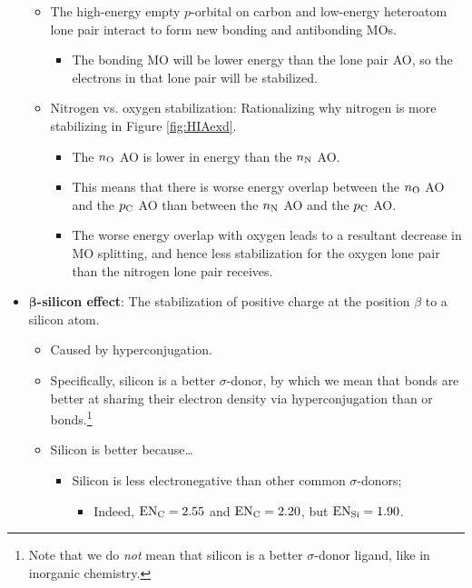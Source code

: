 \documentclass[../notes.tex]{subfiles}
\begin{document}
\begin{itemize}
    \begin{itemize}
        \item The high-energy empty $p$-orbital on carbon and low-energy heteroatom lone pair interact to form new bonding and antibonding MOs.
        \begin{itemize}
            \item The bonding MO will be lower energy than the lone pair AO, so the electrons in that lone pair will be stabilized.
        \end{itemize}
        \item Nitrogen vs. oxygen stabilization: Rationalizing why nitrogen is more stabilizing in Figure \ref{fig:HIAexd}.
        \begin{itemize}
            \item The $n_{\ce{O}}$ AO is lower in energy than the $n_{\ce{N}}$ AO.
            \item This means that there is worse energy overlap between the $n_{\ce{O}}$ AO and the $p_{\ce{C}}$ AO than between the $n_{\ce{N}}$ AO and the $p_{\ce{C}}$ AO.
            \item The worse energy overlap with oxygen leads to a resultant decrease in MO splitting, and hence less stabilization for the oxygen lone pair than the nitrogen lone pair receives.
        \end{itemize}
    \end{itemize}
    \item \textbf{$\bm{\beta}$-silicon effect}: The stabilization of positive charge at the position $\beta$ to a silicon atom.
    \begin{itemize}
        \item Caused by hyperconjugation.
        \item Specifically, silicon is a better $\sigma$-donor, by which we mean that  bonds are better at sharing their electron density via hyperconjugation than  or  bonds.\footnote{Note that we do \emph{not} mean that silicon is a better $\sigma$-donor ligand, like in inorganic chemistry.}
        \item Silicon is better because\dots
        \begin{itemize}
            \item Silicon is less electronegative than other common $\sigma$-donors;
            \begin{itemize}
                \item Indeed, $\text{EN}_{\ce{C}}=2.55$ and $\text{EN}_{\ce{C}}=2.20$, but $\text{EN}_{\ce{Si}}=1.90$.

\end{itemize}
\end{itemize}
\end{itemize}
\end{itemize}
\end{document}
